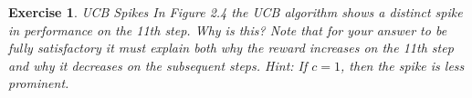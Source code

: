 \documentclass[answers]{exam}
\newtheorem{exercise}[theorem]{Exercise}
\theoremstyle{definition}
\theoremstyle{remark}
\begin{document}


\begin{exercise}
\textit{UCB Spikes} In Figure 2.4 the UCB algorithm shows a distinct spike in performance on the 11th step. Why is this? Note that for your answer to be fully satisfactory it must explain both why the reward increases on the 11th step and why it decreases on the subsequent steps. Hint: If $c = 1$, then the spike is less prominent.    
\end{exercise}
\begin{solution}
    
\end{solution}



\end{document}
